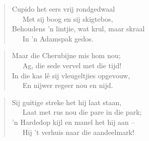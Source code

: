 \begin{verse}
Cupido het eers vrij rondgedwaal \\ 
\ \ \ Met sij boog en sij skigtebos, \\ 
Behoudens ’n lintjie, wat krul, maar skraal \\ 
\ \ \ In ’n Adamspak gedos. \\ 
\end{verse}

\begin{verse}
Maar die Cherubijne mis hom nou; \\ 
\ \ \ Ag, die sede vervel met die tijd! \\ 
In die kas lê sij vleugeltjies opgevouw, \\ 
\ \ \ En nijwer regeer nou en nijd. \\ 
\end{verse}

\begin{verse}
Sij guitige streke het hij laat staan, \\ 
\ \ \ Laat met rus nou die pare in die park; \\ 
’n Hardedop kijl en manel het hij aan --  \\ 
\ \ \ Hij ’t verhuis naar die aandeelmark! \\ 
\end{verse}